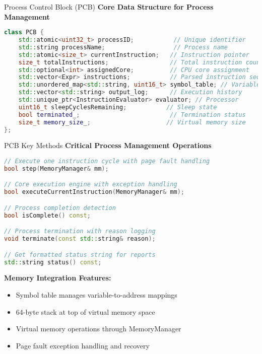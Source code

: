\documentclass[10pt]{beamer}
\begin{document}
\begin{frame}[fragile]{Process Control Block (PCB)}
    \textbf{Core Data Structure for Process Management}
    \begin{lstlisting}[language=C++]
class PCB {
    std::atomic<uint32_t> processID;           // Unique identifier
    std::string processName;                   // Process name
    std::atomic<size_t> currentInstruction;   // Instruction pointer
    size_t totalInstructions;                 // Total instruction count
    std::optional<int> assignedCore;          // CPU core assignment
    std::vector<Expr> instructions;           // Parsed instruction sequence
    std::unordered_map<std::string, uint16_t> symbol_table; // Variables
    std::vector<std::string> output_log;      // Execution history
    std::unique_ptr<InstructionEvaluator> evaluator; // Processor
    uint16_t sleepCyclesRemaining;           // Sleep state
    bool terminated_;                         // Termination status
    size_t memory_size_;                     // Virtual memory size
};
    \end{lstlisting}
\end{frame}

\begin{frame}[fragile]{PCB Key Methods}
    \textbf{Critical Process Management Operations}
    \begin{lstlisting}[language=C++]
// Execute one instruction cycle with page fault handling
bool step(MemoryManager& mm);

// Core execution engine with exception handling
bool executeCurrentInstruction(MemoryManager& mm);

// Process completion detection
bool isComplete() const;

// Process termination with reason logging
void terminate(const std::string& reason);

// Get formatted status string for reports
std::string status() const;
    \end{lstlisting}
    
    \vspace{0.3cm}
    \textbf{Memory Integration Features:}
    \begin{itemize}
        \item Symbol table manages variable-to-address mappings
        \item 64-byte stack at top of virtual memory space
        \item Virtual memory operations through MemoryManager
        \item Page fault exception handling and recovery
    \end{itemize}
\end{frame}
\end{document}
